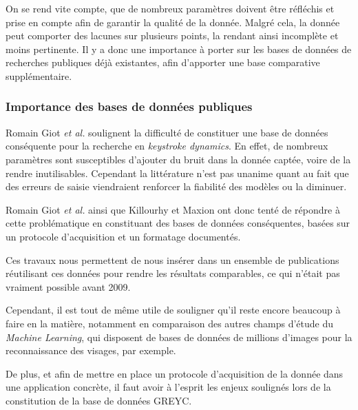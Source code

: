 On se rend vite compte, que de nombreux paramètres doivent être réfléchis et prise en compte afin de garantir la qualité de la donnée. Malgré cela, la donnée peut comporter des lacunes sur plusieurs points, la rendant ainsi incomplète et moins pertinente. Il y a donc une importance à porter sur les bases de données de recherches publiques déjà existantes, afin d'apporter une base comparative supplémentaire.

\subsubsection{Importance des bases de données publiques}

Romain Giot \textit{et al.}\cite{giotGREYC} soulignent la difficulté de constituer une base de données conséquente pour la recherche en \textit{keystroke dynamics}. En effet, de nombreux paramètres sont susceptibles d'ajouter du bruit dans la donnée captée, voire de la rendre inutilisables. Cependant la littérature n'est pas unanime quant au fait que des erreurs de saisie viendraient renforcer la fiabilité des modèles ou la diminuer.

Romain Giot \textit{et al.} \cite{giotGREYC} ainsi que Killourhy et Maxion \cite{killourhy2009} ont donc tenté de répondre à cette problématique en constituant des bases de données conséquentes, basées sur un protocole d'acquisition et un formatage documentés.

Ces travaux nous permettent de nous insérer dans un ensemble de publications réutilisant ces données pour rendre les résultats comparables, ce qui n'était pas vraiment possible avant 2009.

Cependant, il est tout de même utile de souligner qu'il reste encore beaucoup à faire en la matière, notamment en comparaison des autres champs d'étude du \textit{Machine Learning}, qui disposent de bases de données de millions d'images pour la reconnaissance des visages, par exemple.

De plus, et afin de mettre en place un protocole d'acquisition de la donnée dans une application concrète, il faut avoir à l'esprit les enjeux soulignés lors de la constitution de la base de données GREYC\cite{giotGREYC}.
